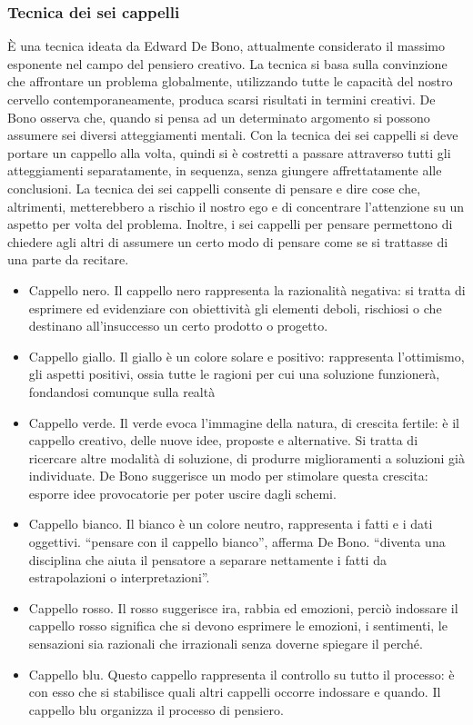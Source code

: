 \subsubsection*{Tecnica dei sei cappelli}
È una tecnica ideata da Edward De Bono, attualmente considerato il massimo esponente nel campo del pensiero creativo. \newline
La tecnica si basa sulla convinzione che affrontare un problema globalmente, utilizzando tutte le capacità del nostro cervello contemporaneamente, produca scarsi risultati in termini creativi. De Bono osserva che, quando si pensa ad un determinato argomento si possono assumere sei diversi atteggiamenti mentali. Con la tecnica dei sei cappelli si deve portare un cappello alla volta, quindi si è costretti a passare attraverso tutti gli atteggiamenti separatamente, in sequenza, senza giungere affrettatamente alle conclusioni. La tecnica dei sei cappelli consente di pensare e dire cose che, altrimenti, metterebbero a rischio il nostro ego e di concentrare l’attenzione su un aspetto per volta del problema. Inoltre, i sei cappelli per pensare permettono di chiedere agli altri di assumere un certo modo di pensare come se si trattasse di una parte da recitare.
\begin{itemize}
	\item Cappello nero. Il cappello nero rappresenta la razionalità negativa: si tratta di esprimere ed evidenziare con obiettività gli elementi deboli, rischiosi o che destinano all’insuccesso un certo prodotto o progetto.
	\item Cappello giallo. Il giallo è un colore solare e positivo: rappresenta l’ottimismo, gli aspetti positivi, ossia tutte le ragioni per cui una soluzione funzionerà, fondandosi comunque sulla realtà
	\item Cappello verde. Il verde evoca l’immagine della natura, di crescita fertile: è il cappello creativo, delle nuove idee, proposte e alternative. Si tratta di ricercare altre modalità di soluzione, di produrre miglioramenti a soluzioni già individuate. De Bono suggerisce un modo per stimolare questa crescita: esporre idee provocatorie per poter uscire dagli schemi.
	\item Cappello bianco. Il bianco è un colore neutro, rappresenta i fatti e i dati oggettivi. “pensare con il cappello bianco”, afferma De Bono. “diventa una disciplina che aiuta il pensatore a separare nettamente i fatti da estrapolazioni o interpretazioni”.
	\item Cappello rosso. Il rosso suggerisce ira, rabbia ed emozioni, perciò indossare il cappello rosso significa che si devono esprimere le emozioni, i sentimenti, le sensazioni sia razionali che irrazionali senza doverne spiegare il perché.
	\item Cappello blu. Questo cappello rappresenta il controllo su tutto il processo: è con esso che si stabilisce quali altri cappelli occorre indossare e quando. Il cappello blu organizza il processo di pensiero.
\end{itemize}


